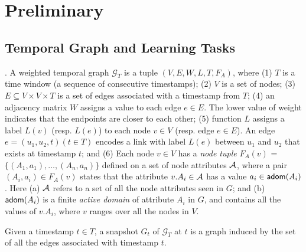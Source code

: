 \section{Preliminary}
\label{sec-pre}

\subsection{Temporal Graph and Learning Tasks} 

. A weighted temporal graph 
$\mathcal{G}_T$ is a  
tuple $(V,E,W,L,T,F_A)$, where (1) $T$ is a time window (a sequence of consecutive timestamps); (2) $V$ is a set of nodes;
(3) ${E \subseteq V \times V \times T}$ is a set of edges associated with a timestamp from $T$; (4) an adjacency matrix $W$ assigns a value to each edge ${e \in E}$. The lower value of weight indicates that the endpoints are closer to each other; (5) function $L$ assigns a label $L(v)$ (resp. $L(e)$) to each node $v \in V$ (resp. edge ${e \in E}$). An edge ${e = (u_1, u_2, t)(t \in T)}$ encodes a link with label $L(e)$ between $u_1$ and $u_2$ that exists at timestamp $t$; and (6) Each node $v\in V$ has a
{\em node tuple} $F_A(v)$ =
$\{(A_1, a_1), \ldots, (A_n,a_n)\}$
defined on a set of node attributes $\A$,
where a pair $(A_i, a_i)\in F_A(v)$
states that the attribute $v.A_i\in\A$ has
a value $a_i\in{\ensuremath {\mathsf{adom}}}(A_i)$. Here
(a) $\A$ refers to a set of all the node
attributes seen in $G$; and (b)
${\mathsf{adom}}(A_i)$ is a finite {\em active domain} of
attribute $A_i$ in $G$, and contains
all the values of $v.A_i$, where $v$ ranges
over all the nodes in $V$.

Given a timestamp ${t \in T}$, a snapshot $G_t$ of $\mathcal{G}_T$ at $t$ is a graph induced by the set of all the edges associated with timestamp $t$.